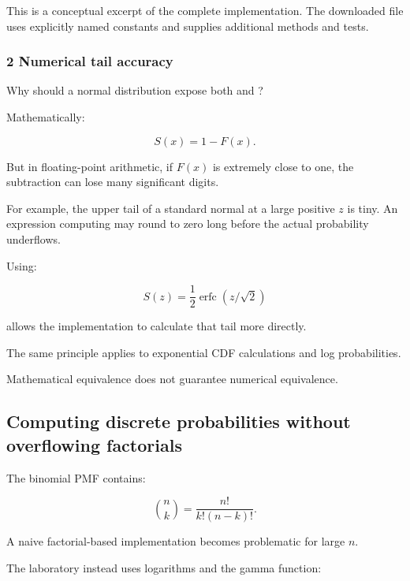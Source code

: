 This is a conceptual excerpt of the complete implementation. The downloaded file uses explicitly named constants and supplies additional methods and tests.

\subsubsection{2 Numerical tail accuracy}\label{02-foundations-ii-ch031-numerical-tail-accuracy}

\hypertarget{02-foundations-ii-ch031-numerical-tail-accuracy}{}

Why should a normal distribution expose both  and ?

Mathematically:

\[
 S(x)=1-F(x).
\]

But in floating-point arithmetic, if \(F(x)\) is extremely close to one, the subtraction can lose many significant digits.

For example, the upper tail of a standard normal at a large positive \(z\) is tiny. An expression computing  may round to zero long before the actual probability underflows.

Using:

\[
 S(z)=\frac12\operatorname{erfc}(z/\sqrt2)
\]

allows the implementation to calculate that tail more directly.

The same principle applies to exponential CDF calculations and log probabilities.

Mathematical equivalence does not guarantee numerical equivalence.

\subsection{Computing discrete probabilities without overflowing factorials}\label{02-foundations-ii-ch031-computing-discrete-probabilities-without-overflowing-factorials}

\hypertarget{02-foundations-ii-ch031-computing-discrete-probabilities-without-overflowing-factorials}{}

The binomial PMF contains:

\[
 \binom nk= \frac{n!}{k!(n-k)!}.
\]

A naive factorial-based implementation becomes problematic for large \(n\).

The laboratory instead uses logarithms and the gamma function:

